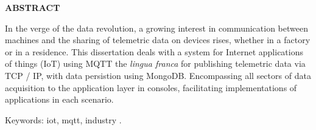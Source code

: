 \begin{center}
\textbf{ABSTRACT}
\end{center}

$\!$\\


In the verge of the data revolution, a growing interest in communication between machines and the sharing of telemetric data on devices rises, whether in a factory or in a residence. This dissertation deals with a system for Internet applications of things (IoT) using MQTT the \textit{lingua franca} for publishing telemetric data via TCP / IP, with data persistion using MongoDB. Encompassing all sectors of data acquisition to the application layer in consoles, facilitating implementations of applications in each scenario.

\vspace{1cm}

\hspace{-1.3cm}Keywords: iot, mqtt, industry .